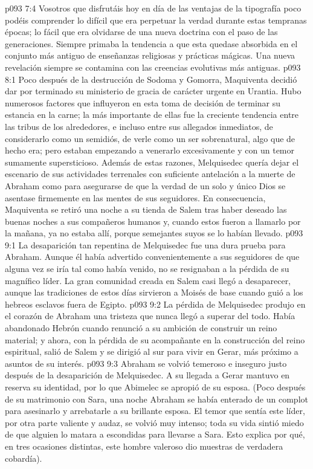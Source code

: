 \vs p093 7:4 \pc Vosotros que disfrutáis hoy en día de las ventajas de la tipografía poco podéis comprender lo difícil que era perpetuar la verdad durante estas tempranas épocas; lo fácil que era olvidarse de una nueva doctrina con el paso de las generaciones. Siempre primaba la tendencia a que esta quedase absorbida en el conjunto más antiguo de enseñanzas religiosas y prácticas mágicas. Una nueva revelación siempre se contamina con las creencias evolutivas más antiguas.
\vs p093 8:1 Poco después de la destrucción de Sodoma y Gomorra, Maquiventa decidió dar por terminado su ministerio de gracia de carácter urgente en Urantia. Hubo numerosos factores que influyeron en esta toma de decisión de terminar su estancia en la carne; la más importante de ellas fue la creciente tendencia entre las tribus de los alrededores, e incluso entre sus allegados inmediatos, de considerarlo como un semidiós, de verle como un ser sobrenatural, algo que de hecho era; pero estaban empezando a venerarlo excesivamente y con un temor sumamente supersticioso. Además de estas razones, Melquisedec quería dejar el escenario de sus actividades terrenales con suficiente antelación a la muerte de Abraham como para asegurarse de que la verdad de un solo y único Dios se asentase firmemente en las mentes de sus seguidores. En consecuencia, Maquiventa se retiró una noche a su tienda de Salem tras haber deseado las buenas noches a sus compañeros humanos y, cuando estos fueron a llamarlo por la mañana, ya no estaba allí, porque semejantes suyos se lo habían llevado.
\vs p093 9:1 La desaparición tan repentina de Melquisedec fue una dura prueba para Abraham. Aunque él había advertido convenientemente a sus seguidores de que alguna vez se iría tal como había venido, no se resignaban a la pérdida de su magnífico líder. La gran comunidad creada en Salem casi llegó a desaparecer, aunque las tradiciones de estos días sirvieron a Moisés de base cuando guió a los hebreos esclavos fuera de Egipto.
\vs p093 9:2 \pc La pérdida de Melquisedec produjo en el corazón de Abraham una tristeza que nunca llegó a superar del todo. Había abandonado Hebrón cuando renunció a su ambición de construir un reino material; y ahora, con la pérdida de su acompañante en la construcción del reino espiritual, salió de Salem y se dirigió al sur para vivir en Gerar, más próximo a asuntos de su interés.
\vs p093 9:3 Abraham se volvió temeroso e inseguro justo después de la desaparición de Melquisedec. A su llegada a Gerar mantuvo en reserva su identidad, por lo que Abimelec se apropió de su esposa. (Poco después de su matrimonio con Sara, una noche Abraham se había enterado de un complot para asesinarlo y arrebatarle a su brillante esposa. El temor que sentía este líder, por otra parte valiente y audaz, se volvió muy intenso; toda su vida sintió miedo de que alguien lo matara a escondidas para llevarse a Sara. Esto explica por qué, en tres ocasiones distintas, este hombre valeroso dio muestras de verdadera cobardía).

